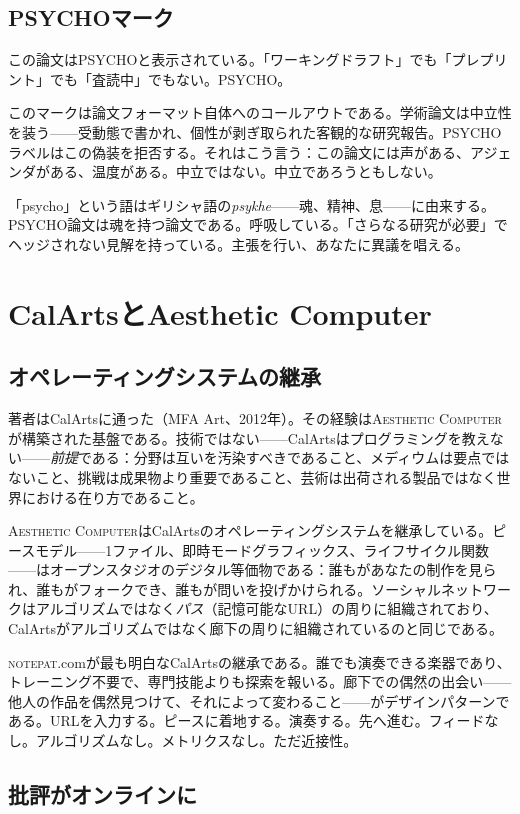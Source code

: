 \documentclass[10pt,letterpaper,twocolumn]{article}
\newcommand{\ac}{\textsc{Aesthetic Computer}}
\newcommand{\np}{\textsc{notepat}}
\begin{document}
\subsection{PSYCHOマーク}

この論文はPSYCHOと表示されている。「ワーキングドラフト」でも「プレプリント」でも「査読中」でもない。PSYCHO。

このマークは論文フォーマット自体へのコールアウトである。学術論文は中立性を装う——受動態で書かれ、個性が剥ぎ取られた客観的な研究報告。PSYCHOラベルはこの偽装を拒否する。それはこう言う：この論文には声がある、アジェンダがある、温度がある。中立ではない。中立であろうともしない。

「psycho」という語はギリシャ語の\textit{psykhe}——魂、精神、息——に由来する。PSYCHO論文は魂を持つ論文である。呼吸している。「さらなる研究が必要」でヘッジされない見解を持っている。主張を行い、あなたに異議を唱える。

\section{CalArtsとAesthetic Computer}

\subsection{オペレーティングシステムの継承}

著者はCalArtsに通った（MFA Art、2012年）。その経験は\ac{}が構築された基盤である。技術ではない——CalArtsはプログラミングを教えない——\emph{前提}である：分野は互いを汚染すべきであること、メディウムは要点ではないこと、挑戦は成果物より重要であること、芸術は出荷される製品ではなく世界における在り方であること。

\ac{}はCalArtsのオペレーティングシステムを継承している。ピースモデル——1ファイル、即時モードグラフィックス、ライフサイクル関数——はオープンスタジオのデジタル等価物である：誰もがあなたの制作を見られ、誰もがフォークでき、誰もが問いを投げかけられる。ソーシャルネットワークはアルゴリズムではなく\emph{パス}（記憶可能なURL）の周りに組織されており、CalArtsがアルゴリズムではなく廊下の周りに組織されているのと同じである。

\np{}.comが最も明白なCalArtsの継承である。誰でも演奏できる楽器であり、トレーニング不要で、専門技能よりも探索を報いる。廊下での偶然の出会い——他人の作品を偶然見つけて、それによって変わること——がデザインパターンである。URLを入力する。ピースに着地する。演奏する。先へ進む。フィードなし。アルゴリズムなし。メトリクスなし。ただ近接性。

\subsection{批評がオンラインに}
\end{document}
